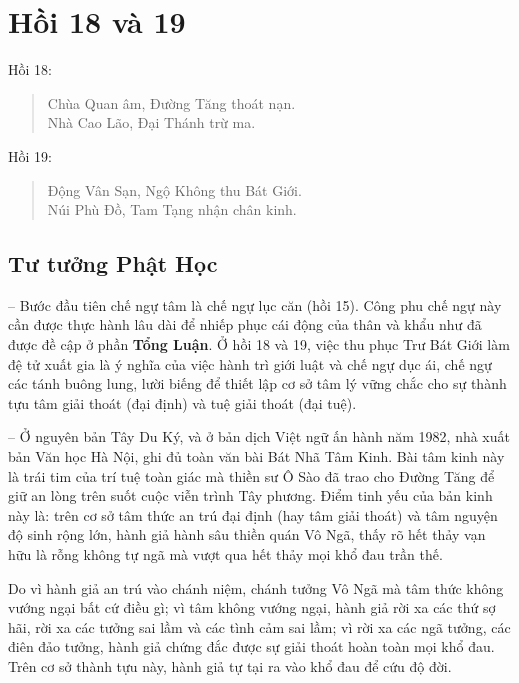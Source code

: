 \chapter{Hồi 18 và 19} %
\label{cha:hoi_18_19}

Hồi 18:

\begin{verse}
\begin{itshape}
Chùa Quan âm, Đường Tăng thoát nạn.\\
Nhà Cao Lão, Đại Thánh trừ ma.
\end{itshape}
\end{verse}

Hồi 19:

\begin{verse}
\begin{itshape}
Động Vân Sạn, Ngộ Không thu Bát Giới.\\
Núi Phù Đồ, Tam Tạng nhận chân kinh.
\end{itshape}
\end{verse}

\section{Tư tưởng Phật Học} %
\label{sec:18_19_phat_hoc}

-- Bước đầu tiên chế ngự tâm là chế ngự lục căn (hồi 15). Công phu chế ngự này cần được thực hành lâu dài để nhiếp phục cái động của thân và khẩu như đã được đề cập ở phần {\bf Tổng Luận}. Ở hồi 18 và 19, việc thu phục Trư Bát Giới làm đệ tử xuất gia là ý nghĩa của việc hành trì giới luật và chế ngự dục ái, chế ngự các tánh buông lung, lười biếng để thiết lập cơ sở tâm lý vững chắc cho sự thành tựu tâm giải thoát (đại định) và tuệ giải thoát (đại tuệ).

-- Ở nguyên bản Tây Du Ký, và ở bản dịch Việt ngữ ấn hành năm 1982, nhà xuất bản Văn học Hà Nội, ghi đủ toàn văn bài Bát Nhã Tâm Kinh. Bài tâm kinh này là trái tim của trí tuệ toàn giác mà thiền sư Ô Sào đã trao cho Đường Tăng để giữ an lòng trên suốt cuộc viễn trình Tây phương. Điểm tinh yếu của bản kinh này là: trên cơ sở tâm thức an trú đại định (hay tâm giải thoát) và tâm nguyện độ sinh rộng lớn, hành giả hành sâu thiền quán Vô Ngã, thấy rõ hết thảy vạn hữu là rỗng không tự ngã mà vượt qua hết thảy mọi khổ đau trần thế.

Do vì hành giả an trú vào chánh niệm, chánh tưởng Vô Ngã mà tâm thức không vướng ngại bất cứ điều gì; vì tâm không vướng ngại, hành giả rời xa các thứ sợ hãi, rời xa các tưởng sai lầm và các tình cảm sai lầm; vì rời xa các ngã tưởng, các điên đảo tưởng, hành giả chứng đắc được sự giải thoát hoàn toàn mọi khổ đau. Trên cơ sở thành tựu này, hành giả tự tại ra vào khổ đau để cứu độ đời.

